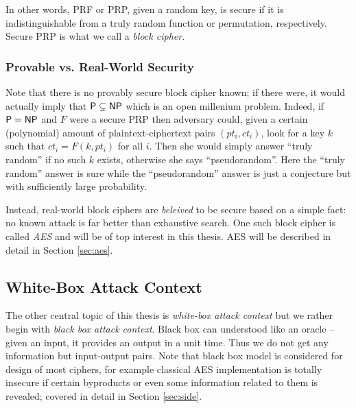 In other words, PRF or PRP, given a random key, is secure if it is indistinguishable from a truly random function or permutation, respectively. Secure PRP is what we call a {\em block cipher}.

\subsubsection{Provable vs. Real-World Security}

Note that there is no provably secure block cipher known; if there were, it would actually imply that $\mathsf{P} \subsetneq \mathsf{NP}$ which is an open millenium problem. Indeed, if $\mathsf{P} = \mathsf{NP}$ and $F$ were a secure PRP then adversary could, given a certain (polynomial) amount of plaintext-ciphertext pairs $(pt_i,ct_i)$, look for a key $k$ such that $ct_i = F(k,pt_i)$ for all $i$. Then she would simply answer ``truly random'' if no such $k$ exists, otherwise she says ``pseudorandom''. Here the ``truly random'' answer is sure while the ``pseudorandom'' answer is just a conjecture but with sufficiently large probability.

Instead, real-world block ciphers are {\em beleived} to be secure based on a simple fact: no known attack is far better than exhaustive search. One such block cipher is called {\em AES} and will be of top interest in this thesis. AES will be described in detail in Section \ref{sec:aes}.



\subsection{White-Box Attack Context}

The other central topic of this thesis is {\em white-box attack context} but we rather begin with {\em black box attack context}. Black box can understood like an oracle -- given an input, it provides an output in a unit time. Thus we do not get any information but input-output pairs. Note that black box model is considered for design of most ciphers, for example classical AES implementation is totally insecure if certain byproducts or even some information related to them is revealed; covered in detail in Section \ref{sec:side}.

